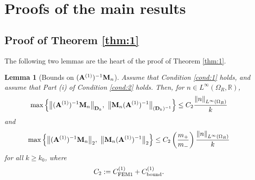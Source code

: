 \documentclass[10pt]{article}%
\newtheorem{lemma}[theorem]{Lemma}
\numberwithin{equation}{section}
\newcommand{\beq}{\begin{equation}}
\newcommand{\eeq}{\end{equation}}
\newcommand{\een}{\end{enumerate}}
\newcommand{\ble}{\begin{lemma}}
\newcommand{\ele}{\end{lemma}}
\newcommand{\Rea}{\mathbb{R}}
\newcommand{\OR}{{\Omega_R}}
\newcommand*{\N}[1]{\left\|#1\right\|}
\newcommand{\matrixD}{{\bf D}}
\newcommand{\matrixM}{{\bf M}}
\newcommand{\matrixAo}{{\bf A}^{(1)}}
\begin{document}
%
%
%


\section{Proofs of the main results}\label{sec:proofs}

\subsection{Proof of Theorem \ref{thm:1}} 

The following two lemmas are the heart of the proof of Theorem \ref{thm:1}.

\ble[Bounds on $(\matrixAo)^{-1} \matrixM_{n}$]\label{lem:keylemma1}
Assume that Condition \ref{cond:1} holds, and assume that Part (i) of Condition \ref{cond:2} holds. Then, for $n\in L^\infty(\OR,\Rea)$,
\beq\label{eq:keybound1}
\max\Big\{\big\| (\matrixAo)^{-1} \matrixM_{n} \big\|_{\matrixD_k}, \,\,
\big\|  \matrixM_{n}(\matrixAo)^{-1} \big\|_{(\matrixD_k)^{-1}}
\Big\}\leq 
C_2
\frac{\N{n}_{L^\infty(\OR)}}{k}
\eeq
and 
\beq\label{eq:keybound1a}
\max\Big\{\big\| (\matrixAo)^{-1} \matrixM_{n} \big\|_2, \,\,
\big\|  \matrixM_{n}(\matrixAo)^{-1} \big\|_2 
\Big\}\leq 
C_2 
\left(\frac{m_+}{m_-}\right) \frac{\N{n}_{L^\infty(\OR)}}{k}
\eeq
for all $k\geq k_0$,
where
\beq\label{eq:C2}
C_2:=%
C_{\rm FEM1}^{(1)} + C_{\rm bound}^{(1)}.%
\eeq
\ele
\end{document}
